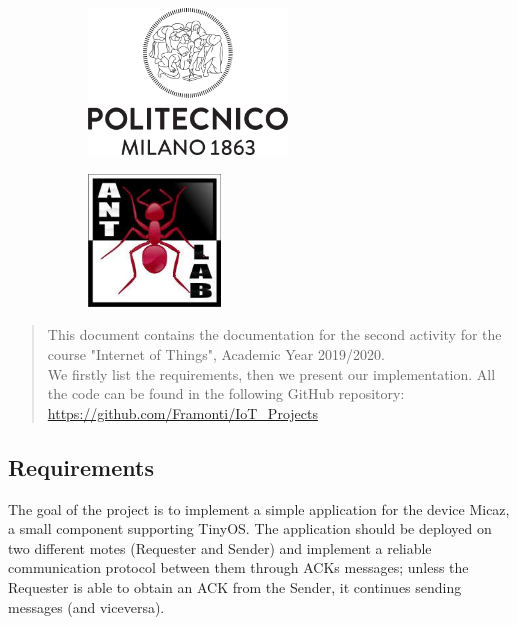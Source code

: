 \documentclass[12pt]{article}
\begin{document}
\begin{titlepage}

\begin{figure}[h]
	\begin{subfigure}{0.5\textwidth}
		\includegraphics[width=150pt, left]{Logo_Politecnico_Milano.png}
	\end{subfigure} 
	\begin{subfigure}{0.5\textwidth}
		\includegraphics[width=100pt, right]{Ant_Lab_Logo.png}
	\end{subfigure}
\end{figure} 
 

\vfill

\end{titlepage}
\begin{abstract}
This document contains the documentation for the second activity for the course "Internet of Things", Academic Year 2019/2020. \\
We firstly list the requirements, then we present our implementation. All the code can be found in the following GitHub repository: \url{https://github.com/Framonti/IoT_Projects}
\end{abstract}
\subsection{Requirements}
The goal of the project is to implement a simple application for the device Micaz, a small component supporting TinyOS. The application should be deployed on two different motes (Requester and Sender) and implement a reliable communication protocol between them through ACKs messages; unless the Requester is able to obtain an ACK from the Sender, it continues sending messages (and viceversa).
\end{document}
